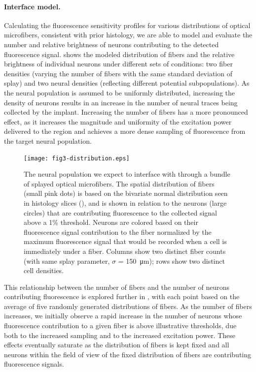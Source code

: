 \paragraph{Interface model.} Calculating the fluorescence sensitivity profiles for various distributions of optical microfibers, consistent with prior histology, we are able to model and evaluate the number and relative brightness of neurons contributing to the detected fluorescence signal.  shows the modeled distribution of fibers and the relative brightness of individual neurons under different sets of conditions: two fiber densities (varying the number of fibers with the same standard deviation of splay) and two neural densities (reflecting different potential subpopulations). As the neural population is assumed to be uniformly distributed, increasing the density of neurons results in an increase in the number of neural traces being collected by the implant. Increasing the number of fibers has a more pronounced effect, as it increases the magnitude and uniformity of the excitation power delivered to the region and achieves a more dense sampling of fluorescence from the target neural population.


\begin{figure}
\texttt{[image: fig3-distribution.eps]}
\caption[Modeled distribution of fibers and neurons]{The neural population we expect to interface with through a bundle of splayed optical microfibers. The spatial distribution of fibers (small pink dots) is based on the bivariate normal distribution seen in histology slices (), and is shown in relation to the neurons (large circles) that are contributing fluorescence to the collected signal above a 1\% threshold. Neurons are colored based on their fluorescence signal contribution to the fiber normalized by the maximum fluorescence signal that would be recorded when a cell is immediately under a fiber. Columns show two distinct fiber counts (with same splay parameter, $\sigma$ = 150~\si{\micro\meter}); rows show two distinct cell densities.}
\label{fig:distribution}
\end{figure}

This relationship between the number of fibers and the number of neurons contributing fluorescence is explored further in , with each point based on the average of five randomly generated distributions of fibers. As the number of fibers increases, we initially observe a rapid increase in the number of neurons whose fluorescence contribution to a given fiber is above illustrative thresholds, due both to the increased sampling and to the increased excitation power. These effects eventually saturate as the distribution of fibers is kept fixed and all neurons within the field of view of the fixed distribution of fibers are contributing fluorescence signals.


